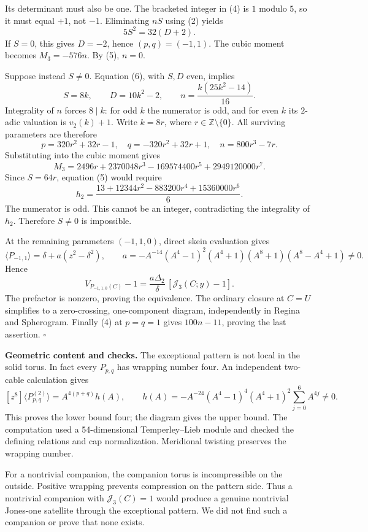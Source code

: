 \documentclass[11pt]{article}
\newcommand{\Z}{\mathbb Z}
\newcommand{\J}{\mathcal J}
\begin{document}
Its determinant must also be one. The bracketed integer in (4) is $1$ modulo $5$, so it must equal $+1$, not $-1$. Eliminating $nS$ using (2) yields
\[
 5S^2=32(D+2).                                      \tag{6}
\]
If $S=0$, this gives $D=-2$, hence $(p,q)=(-1,1)$. The cubic moment becomes $M_3=-576n$. By (5), $n=0$.

Suppose instead $S\ne0$. Equation (6), with $S,D$ even, implies
\[
 S=8k,\qquad D=10k^2-2,\qquad
 n=\frac{k(25k^2-14)}{16}.
\]
Integrality of $n$ forces $8\mid k$: for odd $k$ the numerator is odd, and for even $k$ its $2$-adic valuation is $v_2(k)+1$. Write $k=8r$, where $r\in\Z\setminus\{0\}$. All surviving parameters are therefore
\[
 p=320r^2+32r-1,\quad q=-320r^2+32r+1,\quad
 n=800r^3-7r.
\]
Substituting into the cubic moment gives
\[
 M_3=2496r+2370048r^3-169574400r^5+2949120000r^7.
\]
Since $S=64r$, equation (5) would require
\[
 h_2=\frac{13+12344r^2-883200r^4+15360000r^6}{6}.
\]
The numerator is odd. This cannot be an integer, contradicting the integrality of $h_2$. Therefore $S\ne0$ is impossible.

At the remaining parameters $(-1,1,0)$, direct skein evaluation gives
\[
 \langle P_{-1,1}\rangle=\delta+a(z^2-\delta^2),\qquad
 a=-A^{-14}(A^4-1)^2(A^4+1)(A^8+1)(A^8-A^4+1)\ne0.
\]
Hence
\[
 V_{P_{-1,1,0}(C)}-1
       =\frac{a\Delta_2}{\delta}\,[\J_3(C;y)-1].
\]
The prefactor is nonzero, proving the equivalence. The ordinary closure at $C=U$ simplifies to a zero-crossing, one-component diagram, independently in Regina and Spherogram. Finally (4) at $p=q=1$ gives $100n-11$, proving the last assertion. \hfill$\square$

\newpage
\textbf{Geometric content and checks.}
The exceptional pattern is not local in the solid torus. In fact every $P_{p,q}$ has wrapping number four. An independent two-cable calculation gives
\[
 [z^8]\langle P_{p,q}^{(2)}\rangle
 =A^{4(p+q)}h(A),\qquad
 h(A)=-A^{-24}(A^4-1)^4(A^4+1)^2\sum_{j=0}^{6}A^{4j}\ne0.
\]
This proves the lower bound four; the diagram gives the upper bound. The computation used a 54-dimensional Temperley--Lieb module and checked the defining relations and cap normalization. Meridional twisting preserves the wrapping number.

For a nontrivial companion, the companion torus is incompressible on the outside. Positive wrapping prevents compression on the pattern side. Thus a nontrivial companion with $\J_3(C)=1$ would produce a genuine nontrivial Jones-one satellite through the exceptional pattern. We did not find such a companion or prove that none exists.
\end{document}
